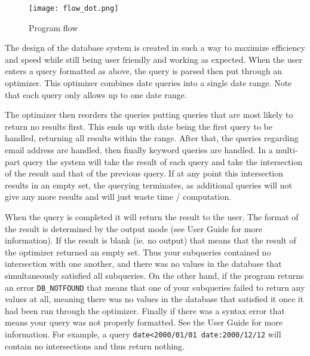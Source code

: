 \begin{figure}[!h]
	\centering
	\texttt{[image: flow\_dot.png]}
	\caption{Program flow}\label{fig:use_flow}
\end{figure}

The design of the database system is created in such a way to maximize efficiency and 
speed while still being user friendly and working as expected.  When the user enters 
a query formatted as above, the query is parsed then put through an optimizer.  This 
optimizer combines date queries into a single date range.  Note that each query only 
allows up to one date range.  

The optimizer then reorders the queries putting queries 
that are most likely to return no results first.  This ends up with date being the 
first query to be handled, returning all results within the range.  After that, the 
queries regarding email address are handled, then finally keyword queries are handled.  
In a multi-part query the system will take the result of each query and take the 
intersection of the result and that of the previous query.  If at any point this 
intersection results in an empty set, the querying terminates, as additional queries 
will not give any more results and will just waste time / computation.  

When the query is completed it will return the result to the user.  The format of the 
result is determined by the output mode (see User Guide for more information).  If the 
result is blank (ie. no output) that means that the result of the optimizer returned 
an empty set.  Thus your subqueries contained no intersection with one another, and there 
was no values in the database that simultaneously satisfied all subqueries.  On the other 
hand, if the program returns an error \verb|DB_NOTFOUND| that means that one of your 
subqueries failed to return any values at all, meaning there was no values in the database 
that satisfied it once it had been run through the optimizer.  Finally if there was a 
syntax error that means your query was not properly formatted.  See the User Guide for 
more information.  For example, a query \verb|date<2000/01/01 date:2000/12/12| will 
contain no intersections and thus return nothing. 
